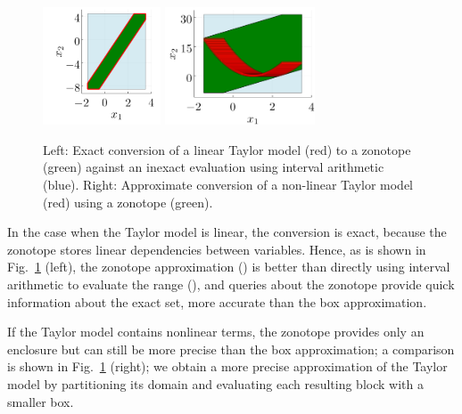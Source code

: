 \begin{figure}
	\centering
	\includegraphics[height=3.5cm, keepaspectratio]{img/taylormodel_linear}
	\includegraphics[height=3.5cm, keepaspectratio]{img/taylormodel_nonlinear}
	\caption{Left: Exact conversion of a linear Taylor model (red) to a zonotope (green) against an inexact evaluation using interval arithmetic (blue). Right: Approximate conversion of a non-linear Taylor model (red) using a zonotope (green).}
	\label{fig:taylormodelsconversion}
\end{figure}

In the case when the Taylor model is linear, the conversion is exact, because the zonotope stores linear dependencies between variables.
%
Hence, as is shown in Fig.~\ref{fig:taylormodelsconversion} (left), the zonotope approximation () is better than directly using interval arithmetic to evaluate the range (), and queries about the zonotope provide quick information about the exact set, more accurate than the box approximation.

%  
% 

\smallskip

If the Taylor model contains nonlinear terms, the zonotope provides only an enclosure but can still be more precise than the box approximation; a comparison is shown in Fig.~\ref{fig:taylormodelsconversion} (right); we obtain a more precise approximation of the Taylor model by partitioning its domain and evaluating each resulting block with a smaller box.

